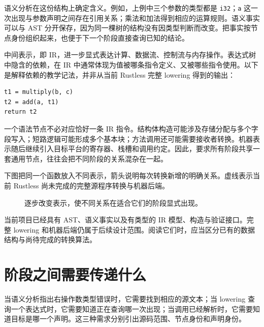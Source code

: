 语义分析在这份结构上确定含义。例如，上例中三个参数的类型都是 \texttt{i32}；\texttt{a} 这一次出现与参数声明之间存在引用关系；乘法和加法得到相应的运算规则。语义事实可以与 AST 分开保存，因为同一棵树的结构没有因类型判断而改变。把事实按节点身份组织起来，也便于下一个阶段直接查询已知的结论。

中间表示，即 IR，进一步显式表达计算、数据流、控制流与内存操作。表达式树中隐含的依赖，在 IR 中通常体现为值被哪条指令定义、又被哪些指令使用。以下是解释依赖的教学记法，并非从当前 Rustless 完整 lowering 得到的输出：
\begin{lstlisting}
t1 = multiply(b, c)
t2 = add(a, t1)
return t2
\end{lstlisting}
一个语法节点不必对应恰好一条 IR 指令。结构体构造可能涉及存储分配与多个字段写入；短路逻辑可能形成多个基本块；方法调用还可能需要接收者转换。机器表示随后继续引入目标平台的寄存器、栈槽和调用约定。因此，要求所有阶段共享一套通用节点，往往会把不同阶段的关系混杂在一起。

下图把同一个函数放入不同表示，箭头说明每次转换新增的明确关系。虚线表示当前 Rustless 尚未完成的完整源程序转换与机器后端。
\begin{figure}[htbp]
\centering
{}
\caption{逐步改变表示，使不同关系在适合它们的阶段显式出现。}
\end{figure}
当前项目已经具有 AST、语义事实以及有类型的 IR 模型、构造与验证接口。完整 lowering 和机器后端仍属于后续设计范围。阅读它们时，应当区分已有的数据结构与尚待完成的转换算法。

\section{阶段之间需要传递什么}
当语义分析指出右操作数类型错误时，它需要找到相应的源文本；当 lowering 查询一个表达式时，它需要知道正在查询哪一次出现；当调用已经解析时，它需要知道目标是哪一个声明。这三种需求分别引出源码范围、节点身份和声明身份。

